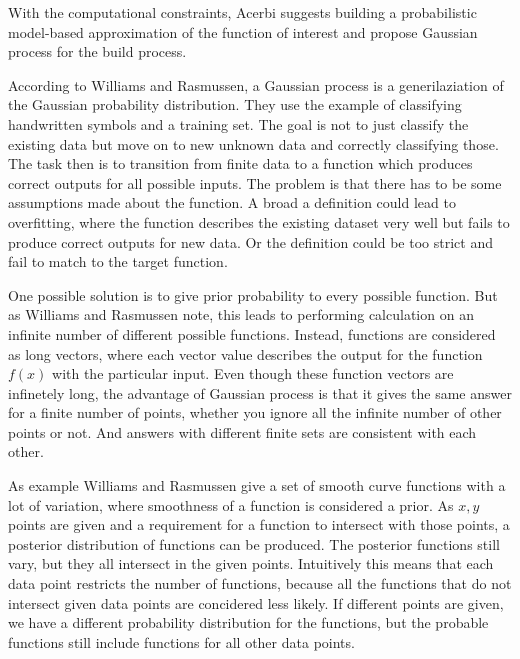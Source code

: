 \documentclass[english,oneside,openany]{UH_DS_report}
\begin{document}
With the computational constraints, Acerbi suggests building a probabilistic model-based
approximation of the function of interest and propose Gaussian process for the build
process\cite{acerbi2018}.

According to Williams and Rasmussen, a Gaussian process is a generilaziation of the Gaussian
probability distribution\cite{gaussian}. They use the example of classifying handwritten symbols and 
a training set. The goal is not to just classify the existing data but move on to new unknown data 
and correctly classifying those. The task then is to transition from finite data to a function which
produces correct outputs for all possible inputs.
The problem is that there has to be some assumptions made about 
the function. A broad a definition could lead to overfitting, where the function describes 
the existing dataset very well but fails to produce correct outputs for new data. Or the 
definition could be too strict and fail to match to the target function.

One possible solution is to give prior probability to every possible function. But as Williams and Rasmussen note,
this leads to performing calculation on an infinite number of different possible functions. Instead, functions 
are considered as long vectors, where each vector value describes the output for the function $f(x)$ with the 
particular input. Even though these function vectors are infinetely long, the advantage of Gaussian process is that it 
gives the same answer for a finite number of points, whether you ignore all 
the infinite number of other points or not. And answers with different finite sets are 
consistent with each other.\cite{gaussian}

As example Williams and Rasmussen give a set of smooth curve functions with a lot of variation, where 
smoothness of a function is considered a prior. As
$x,y$ points are given and a requirement for a function to intersect with those points, a posterior distribution
of functions can be produced. The posterior functions still vary, but they all intersect in the given points.
Intuitively this means that each data point restricts the number of functions, because all the functions
that do not intersect given data points are concidered less likely. If different points are given, we have 
a different probability distribution for the functions, but the probable functions still include functions for
all other data points.\cite{gaussian}
\end{document}
